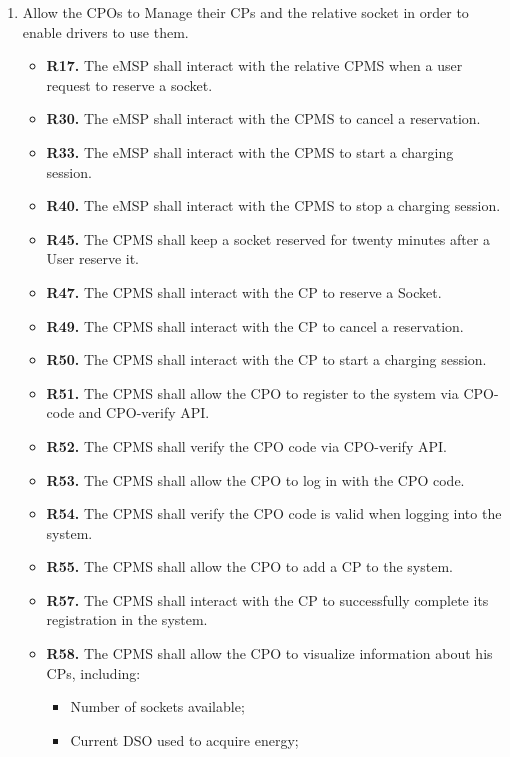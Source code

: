 \documentclass{Configuration_Files/PoliMi3i_thesis}
\begin{document}
\begin{enumerate}[label=\textbf{G\arabic*}]
    \item Allow the CPOs to Manage their CPs and the relative socket in order to enable drivers to use them.
        \begin{itemize}
            \item \textbf{R17.} The eMSP shall interact with the relative CPMS when a user request to reserve a socket.
            \item \textbf{R30.} The eMSP shall interact with the CPMS to cancel a reservation.
            \item \textbf{R33.} The eMSP shall interact with the CPMS to start a charging session.
            \item \textbf{R40.} The eMSP shall interact with the CPMS to stop a charging session.
            \item \textbf{R45.} The CPMS shall keep a socket reserved for twenty minutes after a User reserve it.
            \item \textbf{R47.} The CPMS shall interact with the CP to reserve a Socket.
            \item \textbf{R49.} The CPMS shall interact with the CP to cancel a reservation.
            \item \textbf{R50.} The CPMS shall interact with the CP to start a charging session.
            \item \textbf{R51.} The CPMS shall allow the CPO to register to the system via CPO-code and CPO-verify API.
            \item \textbf{R52.} The CPMS shall verify the CPO code via CPO-verify API.
            \item \textbf{R53.} The CPMS shall allow the CPO to log in with the CPO code.
            \item \textbf{R54.} The CPMS shall verify the CPO code is valid when logging into the system.
            \item \textbf{R55.} The CPMS shall allow the CPO to add a CP to the system.
            \item \textbf{R57.} The CPMS shall interact with the CP to successfully complete its registration in the system.
            \item \textbf{R58.} The CPMS shall allow the CPO to visualize information about his CPs, including:
                \begin{itemize}
                    \item Number of sockets available;
                    \item Current DSO used to acquire energy;

\end{itemize}
\end{itemize}
\end{enumerate}
\end{document}
